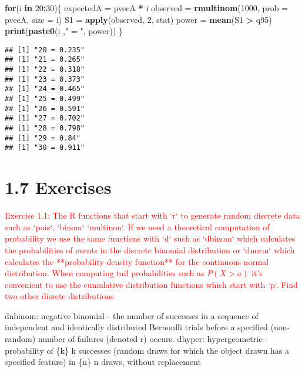 \documentclass[]{article}
\newenvironment{Shaded}{\begin{snugshade}}{\end{snugshade}}
\newcommand{\KeywordTok}[1]{\textcolor[rgb]{0.13,0.29,0.53}{\textbf{#1}}}
\newcommand{\DataTypeTok}[1]{\textcolor[rgb]{0.13,0.29,0.53}{#1}}
\newcommand{\DecValTok}[1]{\textcolor[rgb]{0.00,0.00,0.81}{#1}}
\newcommand{\StringTok}[1]{\textcolor[rgb]{0.31,0.60,0.02}{#1}}
\newcommand{\ControlFlowTok}[1]{\textcolor[rgb]{0.13,0.29,0.53}{\textbf{#1}}}
\newcommand{\OperatorTok}[1]{\textcolor[rgb]{0.81,0.36,0.00}{\textbf{#1}}}
\newcommand{\NormalTok}[1]{#1}
\begin{document}
\begin{Shaded}
\begin{Highlighting}[]
\ControlFlowTok{for}\NormalTok{(i }\ControlFlowTok{in} \DecValTok{20}\OperatorTok{:}\DecValTok{30}\NormalTok{)\{}
\NormalTok{  expectedA =}\StringTok{ }\NormalTok{pvecA }\OperatorTok{*}\StringTok{ }\NormalTok{i}
\NormalTok{  observed =}\StringTok{ }\KeywordTok{rmultinom}\NormalTok{(}\DecValTok{1000}\NormalTok{, }\DataTypeTok{prob =}\NormalTok{ pvecA, }\DataTypeTok{size =}\NormalTok{ i)}
\NormalTok{  S1 =}\StringTok{ }\KeywordTok{apply}\NormalTok{(observed, }\DecValTok{2}\NormalTok{, stat)}
\NormalTok{  power =}\StringTok{ }\KeywordTok{mean}\NormalTok{(S1 }\OperatorTok{>}\StringTok{ }\NormalTok{q95)}
  \KeywordTok{print}\NormalTok{(}\KeywordTok{paste0}\NormalTok{(i ,}\StringTok{" = "}\NormalTok{, power))}
\NormalTok{\}}
\end{Highlighting}
\end{Shaded}

\begin{verbatim}
## [1] "20 = 0.235"
## [1] "21 = 0.265"
## [1] "22 = 0.318"
## [1] "23 = 0.373"
## [1] "24 = 0.465"
## [1] "25 = 0.499"
## [1] "26 = 0.591"
## [1] "27 = 0.702"
## [1] "28 = 0.798"
## [1] "29 = 0.84"
## [1] "30 = 0.911"
\end{verbatim}

\section{1.7 Exercises}\label{exercises}

\textcolor{red}{Exercise 1.1: The R functions that start with `r` to generate random discrete data such as `pois`, `binom` `multinon`. If we need a theoretical computation of probability we use the same functions with `d` such as `dbinom` which calculates the probabilities of events in the discrete binomial distribution or `dnorm` which calculates the **probability density function** for the continuous normal distribution. When computing tail probabilities such as $P(X>a)$ it's convenient to use the cumulative distribution functions which start with `p`. Find two other disrete distributions}

dnbinom: negative binomial - the number of successes in a sequence of
independent and identically distributed Bernoulli trials before a
specified (non-random) number of failures (denoted r) occurs. dhyper:
hypergeometric - probability of \{\displaystyle k\} k successes (random
draws for which the object drawn has a specified feature) in
\{\displaystyle n\} n draws, without replacement
\end{document}
